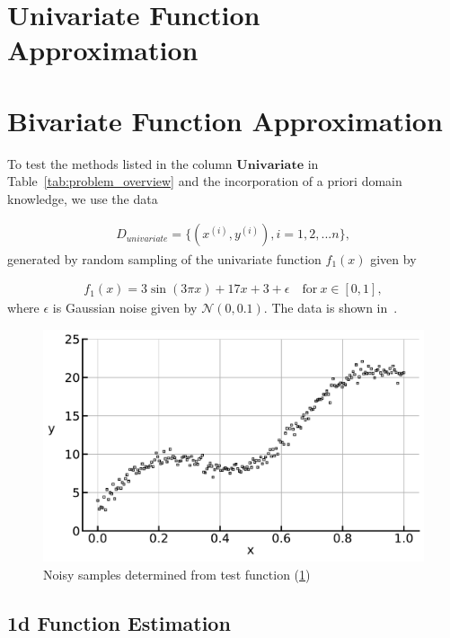 \section{Univariate Function Approximation}

\section{Bivariate Function Approximation}
To test the methods listed in the column $\textbf{Univariate}$ in Table~\ref{tab:problem_overview} and the incorporation of a priori domain knowledge, we use the data

\begin{align} \label{eq:dataset-univariate}
	D_{univariate} = \{(x^{(i)}, y^{(i)}), i=1,2,...n\},
\end{align}
%
generated by random sampling of the univariate function $f_1(x)$ given by 

\begin{align}\label{eq:test_func}
	f_1(x) = 3\sin(3\pi x) + 17x + 3 + \epsilon \quad \text{for} \ x \in [0,1],
\end{align}
%
where $\epsilon$ is Gaussian noise given by $\mathcal{N}(0, 0.1)$. The data is shown in~. 

\begin{figure}[H]
	\centering
	\includegraphics[width=\columnwidth]{thesisplots/test_func.pdf}
	\caption{Noisy samples determined from test function (\ref{fig:test_func})}
	\label{fig:test_func}
\end{figure}



\subsection{1d Function Estimation} \label{subsec:1d-function-estimation}

